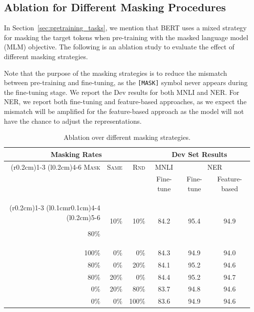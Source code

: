 \documentclass[11pt,a4paper]{article}
\begin{document}
\subsection{Ablation for Different Masking Procedures}
\label{appendix:sec:different_masks}

In Section~\ref{sec:pretraining_tasks}, we mention that BERT uses a mixed strategy for masking the target tokens when pre-training with the masked language
model (MLM) objective. The following is an ablation study to evaluate the effect of different masking strategies.

Note that the purpose of the masking strategies is to reduce the mismatch
between pre-training and fine-tuning, as the {\tt [MASK]} symbol never appears during the fine-tuning stage. We report the Dev results for both
MNLI and NER. For NER, we report both fine-tuning and feature-based approaches,
as we expect the mismatch will be amplified for the feature-based approach as
the model will not have the chance to adjust the representations.

\begin{table}[ht]
\begin{center}
{\small
\begin{tabular}{@{}rrrccc@{}}
  \toprule
  \multicolumn{3}{c}{Masking Rates} & \multicolumn{3}{c}{Dev Set Results} \\
  \cmidrule(r{0.2cm}){1-3}
  \cmidrule(l{0.2cm}){4-6}
  \textsc{Mask} &	\textsc{Same}&	\textsc{Rnd}	& {MNLI} &	\multicolumn{2}{c}{NER}\\
   &  & & {\footnotesize Fine-tune} &   {\footnotesize Fine-tune}	& {\footnotesize Feature-based}\\
    \cmidrule(r{0.2cm}){1-3}
  \cmidrule(l{0.1cm}r{0.1cm}){4-4}
  \cmidrule(l{0.2cm}){5-6}
  
  80\%	&10\%	&10\%	&84.2	&95.4	&94.9\\
100\%	&0\%	&0\%	&84.3	&94.9	&94.0\\
80\%	&0\%	&20\%	&84.1	&95.2	&94.6\\
80\%	&20\%	&0\%	&84.4	&95.2	&94.7\\
0\%	&20\%	&80\%	&83.7	&94.8	&94.6 \\
0\%	&0\%	&100\%	&83.6	&94.9	&94.6\\
\bottomrule
\end{tabular}
} %
\end{center}
\caption{\label{tab:mask_ablation} Ablation over different masking strategies.}
\end{table}
\end{document}
